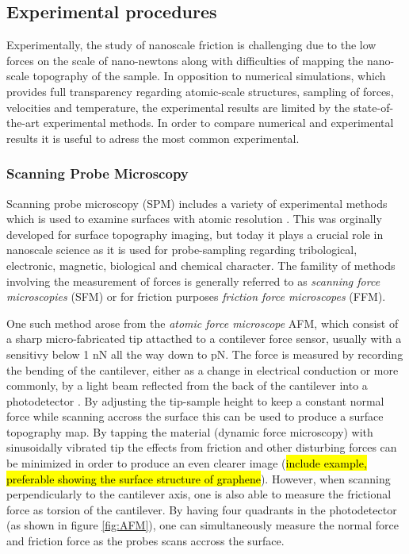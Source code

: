 \subsection{Experimental procedures}



Experimentally, the study of nanoscale friction is challenging due to the low
forces on the scale of nano-newtons along with difficulties of mapping the
nano-scale topography of the sample. In opposition to numerical simulations, which provides full
transparency regarding atomic-scale structures, sampling of forces, velocities
and temperature, the experimental results are limited by the state-of-the-art
experimental methods. In order to compare numerical and experimental results it is useful to adress the most common experimental.

\subsubsection{Scanning Probe Microscopy}\label{sec:SPM} Scanning probe
microscopy (\acrshort{SPM}) includes a variety of experimental methods which is used to
examine surfaces with atomic resolution \cite[pp. 6-27]{BHUSHAN20051507}. This was
orginally developed for surface topography imaging, but today it plays a crucial
role in nanoscale science as it is used for probe-sampling regarding
tribological, electronic, magnetic, biological and chemical character. The
famility of methods involving the measurement of forces is generally referred to
as \textit{scanning force microscopies} (\acrshort{SFM}) or for friction purposes
\textit{friction force microscopes} (\acrshort{FFM}).

One such method arose from the \textit{atomic force microscope} \acrshort{AFM}, which consist
of a sharp micro-fabricated tip attacthed to a contilever force sensor, usually
with a sensitivy below 1 nN all the way down to pN. The force is measured by recording the bending of
the cantilever, either as a change in electrical conduction or more commonly, by
a light beam reflected from the back of the cantilever into a photodetector
\cite[p. 183]{gnecco_meyer_2015}. By adjusting the tip-sample height to keep a constant
normal force while scanning accross the surface this can be used to produce a
surface topography map. By tapping the material (dynamic force microscopy) with
sinusoidally vibrated tip the effects from friction and other disturbing forces
can be minimized in order to produce an even clearer image (\hl{include example,
preferable showing the surface structure of graphene}). However, when scanning
perpendicularly to the cantilever axis, one is also able to measure the
frictional force as torsion of the cantilever. By having four quadrants in the
photodetector (as shown in figure \cref{fig:AFM}), one can simultaneously
measure the normal force and friction force as the probes scans accross the
surface. 

